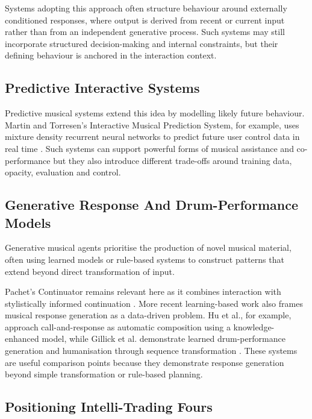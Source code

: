 Systems adopting this approach often structure behaviour around
externally conditioned responses, where output is derived from recent or
current input rather than from an independent generative process. Such
systems may still incorporate structured decision-making and internal
constraints, but their defining behaviour is anchored in the interaction
context.

\subsection{Predictive Interactive Systems}\label{predictive-interactive-systems}

Predictive musical systems extend this idea by modelling likely future
behaviour. Martin and Torresen's Interactive Musical Prediction System,
for example, uses mixture density recurrent neural networks to predict
future user control data in real time \citep{martin2019interactive}. Such
systems can support powerful forms of musical assistance and
co-performance but they also introduce different trade-offs around
training data, opacity, evaluation and control.

\subsection{Generative Response And Drum-Performance Models}\label{generative-response-and-drum-performance-models}

Generative musical agents prioritise the production of novel musical
material, often using learned models or rule-based systems to construct
patterns that extend beyond direct transformation of input.

Pachet's Continuator remains relevant here as it combines interaction
with stylistically informed continuation \citep{pachet2002continuator}. More recent
learning-based work also frames musical response generation as a
data-driven problem. Hu et al., for example, approach call-and-response
as automatic composition using a knowledge-enhanced model, while Gillick
et al. demonstrate learned drum-performance generation and humanisation
through sequence transformation \citep{hu2024responding,gillick2019learning}. These systems are useful comparison points because they
demonstrate response generation beyond simple transformation or
rule-based planning.

\subsection{Positioning Intelli-Trading Fours}\label{positioning-intelli-trading-fours}


